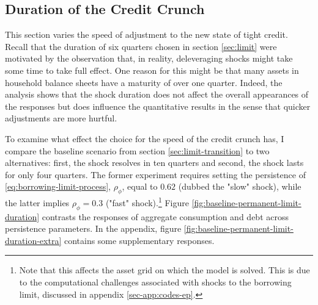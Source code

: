\documentclass[12pt]{article} %
\numberwithin{equation}{section} %
\numberwithin{figure}{section}
\numberwithin{table}{section}
\begin{document}
\subsection{Duration of the Credit Crunch}
\label{sec:sensitivity-persistence}

This section varies the speed of adjustment to the new state of tight credit. Recall that the duration of six quarters chosen in section \ref{sec:limit} were motivated by the observation that, in reality, deleveraging shocks might take some time to take full effect. One reason for this might be that many assets in household balance sheets have a maturity of over one quarter. Indeed, the analysis shows that the shock duration does not affect the overall appearances of the responses but does influence the quantitative results in the sense that quicker adjustments are more hurtful.

To examine what effect the choice for the speed of the credit crunch has, I compare the baseline scenario from section \ref{sec:limit-transition} to two alternatives: first, the shock resolves in ten quarters and second, the shock lasts for only four quarters. The former experiment requires setting the persistence of \eqref{eq:borrowing-limit-process}, $ \rho_{\phi}$, equal to $0.62$ (dubbed the "slow" shock), while the latter implies $\rho_{\phi} = 0.3$ ("fast" shock).\footnote{Note that this affects the asset grid on which the model is solved. This is due to the computational challenges associated with shocks to the borrowing limit, discussed in appendix \ref{sec-app:codes-ep}.} Figure \ref{fig:baseline-permanent-limit-duration} contrasts the responses of aggregate consumption and debt across persistence parameters. In the appendix, figure \ref{fig:baseline-permanent-limit-duration-extra} contains some supplementary responses. %
\end{document}
